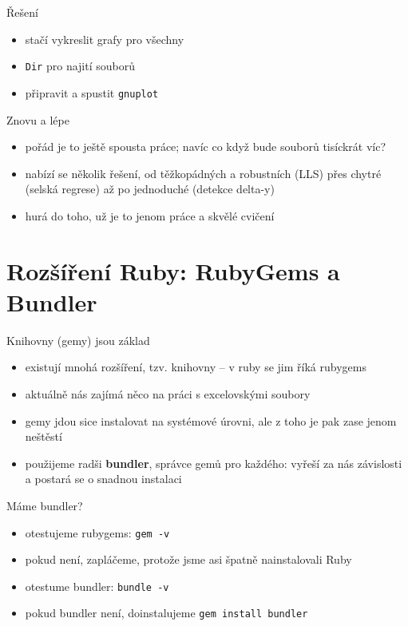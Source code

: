 \documentclass{beamer}
\begin{document}
\begin{frame}{Řešení}
  \begin{itemize}
    \item stačí vykreslit grafy pro všechny
    \item \texttt{Dir} pro najití souborů
    \item připravit a spustit \texttt{gnuplot}
  \end{itemize}
\end{frame}

\begin{frame}{Znovu a lépe}
  \begin{itemize}
    \item pořád je to ještě spousta práce; navíc co když bude souborů tisíckrát víc?
    \item nabízí se několik řešení, od těžkopádných a robustních (LLS) přes chytré (selská regrese) až po jednoduché (detekce delta-y)
    \item hurá do toho, už je to jenom práce a skvělé cvičení
  \end{itemize}
\end{frame}

\section{Rozšíření Ruby: RubyGems a Bundler}

\begin{frame}{Knihovny (gemy) jsou základ}
  \begin{itemize}
    \item existují mnohá rozšíření, tzv. knihovny -- v ruby se jim říká rubygems
    \item aktuálně nás zajímá něco na práci s excelovskými soubory
    \item gemy jdou sice instalovat na systémové úrovni, ale z toho je pak zase jenom neštěstí
    \item použijeme radši \textbf{bundler}, správce gemů pro každého: vyřeší za nás závislosti a postará se o snadnou instalaci
  \end{itemize}
\end{frame}

\begin{frame}{Máme bundler?}
  \begin{itemize}
    \item otestujeme rubygems: \texttt{gem -v}
    \item pokud není, zapláčeme, protože jsme asi špatně nainstalovali Ruby
    \item otestume bundler: \texttt{bundle -v}
    \item pokud bundler není, doinstalujeme \texttt{gem install bundler}
  \end{itemize}
\end{frame}
\end{document}
